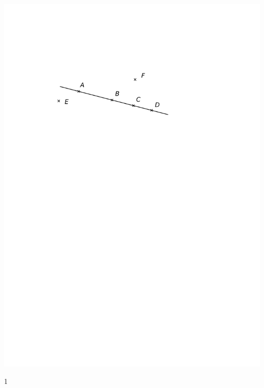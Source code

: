 \documentclass[a4paper,11pt]{report}
\begin{document}
\begin{exop}
{\begin{center}
	\includegraphics[scale=0.8]{media/es-11/13-4}
\end{center}
}
{1}
\end{exop}
\end{document}

